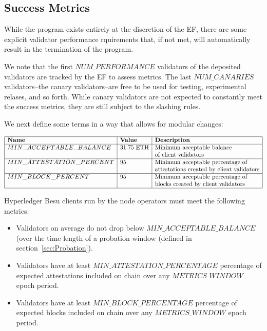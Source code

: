 \subsection{Success Metrics}
While the program exists entirely at the discretion of the EF, there are some explicit validator performance rquirements that, if not met, will automatically result in the termination of the program.

We note that the first $NUM\_PERFORMANCE$ validators of the deposited validators are tracked by the EF to assess metrics.  The last $NUM\_CANARIES$ validators--the canary validators--are free to be used for testing, experimental relases, and so forth.  While canary validators are not expected to constantly meet the success metrics, they are still subject to the slashing rules.

We next define some terms in a way that allows for modular changes:

\[
\begin{array}{|l|l|l|}
\hline
\textbf{Name} & \textbf{Value} & \textbf{Description} \\
\hline
MIN\_ACCEPTABLE\_BALANCE & 31.75 \text{ ETH} & \text{Minimum acceptable balance} \\
& & \text{of client validators} \\
\hline
MIN\_ATTESTATION\_PERCENT & 95 & \text{Minimum acceptable percentage of} \\
& & \text{attestations created by client validators} \\
\hline
MIN\_BLOCK\_PERCENT & 95 & \text{Minimum acceptable percentage of} \\
& & \text{blocks created by client validators} \\
\hline
\end{array}
\]

Hyperledger Besu clients run by the node operators must meet the following metrics:
\begin{itemize}
\item Validators on average do not drop below $MIN\_ACCEPTABLE\_BALANCE$ (over the time length of a probation window (defined in section~\ref{sec:Probation}).
\item Validators have at least $MIN\_ATTESTATION\_PERCENTAGE$ percentage of expected attestations included on chain over any $METRICS\_WINDOW$ epoch period.
\item Validators have at least $MIN\_BLOCK\_PERCENTAGE$ percentage of expected blocks included on chain over any $METRICS\_WINDOW$ epoch period.
\end{itemize}

